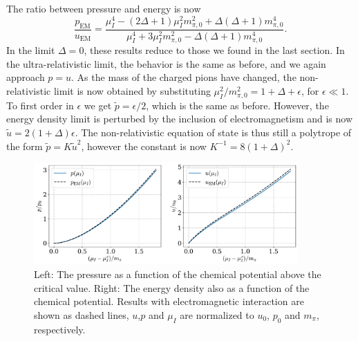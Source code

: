 \endgroup
%
The ratio between pressure and energy is now
%
\begin{equation}
    \frac{p_\text{EM}}{u_\text{EM}} 
    = 
    \frac{
        {\mu_I^4} - (2\Delta + 1) {\mu_I^2}{m_{\pi,0}^2} + \Delta(\Delta + 1)m_{\pi,0}^4
        }{
        {\mu_I^4} + 3 {\mu_I^2}{m_{\pi,0}^2} - \Delta (\Delta +1) m_{\pi,0}^4
        }.
\end{equation}
%
In the limit $\Delta = 0$, these results reduce to those we found in the last section.
In the ultra-relativistic limit, the behavior is the same as before, and we again approach $p = u$.
As the mass of the charged pions have changed, the non-relativistic limit is now obtained by substituting ${\mu_I^2}/{m_{\pi,0}^2} = 1 + \Delta + \epsilon$, for $\epsilon \ll 1$.
To first order in $\epsilon$ we get $\tilde p = \epsilon / 2$, which is the same as before.
However, the energy density limit is perturbed by the inclusion of electromagnetism and is now $\tilde u = 2(1 + \Delta) \epsilon$.
The non-relativistic equation of state is thus still a polytrope of the form $\tilde p = K \tilde u^2$, however the constant is now $K^{-1} = 8 (1+\Delta)^2$.


\begin{figure}[!htb]
    \centering
    \includegraphics[width=0.9\textwidth]{../scripts/figurer/pion_star/pion_up.pdf}
    \caption{
        Left: The pressure as a function of the chemical potential above the critical value.
        Right: The energy density also as a function of the chemical potential.
        Results with electromagnetic interaction are shown as dashed lines, $u$,$ p$ and $\mu_I$ are normalized to $u_0$, $p_0$ and $m_\pi$, respectively.
        }
        \label{fig: pressure and energy with EM interaction}
\end{figure}



